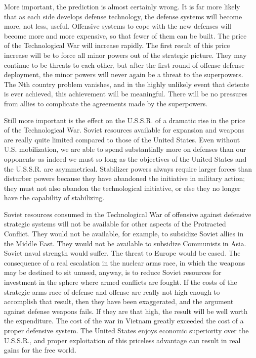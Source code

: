 More important, the prediction is almost certainly wrong. It is far more likely that as each side develops defense technology, the defense systems will become more, not less, useful. Offensive systems to cope with the new defenses will become more and more expensive, so that fewer of them can be built. The price of the Technological War will increase rapidly. The first result of this price increase will be to force all minor powers out of the strategic picture. They may continue to be threats to each other, but after the first round of offense-defense deployment, the minor powers will never again be a threat to the superpowers. The Nth country problem vanishes, and in the highly unlikely event that detente is ever achieved, this achievement will be meaningful. There will be no pressures from allies to complicate the agreements made by the superpowers.

Still more important is the effect on the U.S.S.R. of a dramatic rise in the price of the Technological War. Soviet resources available for expansion and weapons are really quite limited compared to those of the United States. Even without U.S. mobilization, we are able to spend substantially more on defenses than our opponents--as indeed we must so long as the objectives of the United States and the U.S.S.R. are asymmetrical. Stabilizer powers always require larger forces than disturber powers because they have abandoned the initiative in military action; they must not also abandon the technological initiative, or else they no longer have the capability of stabilizing.

Soviet resources consumed in the Technological War of offensive against defensive strategic systems will not be available for other aspects of the Protracted Conflict. They would not be available, for example, to subsidize Soviet allies in the Middle East. They would not be available to subsidize Communists in Asia. Soviet naval strength would suffer. The threat to Europe would be eased. The consequence of a real escalation in the nuclear arms race, in which the weapons may be destined to sit unused, anyway, is to reduce Soviet resources for investment in the sphere where armed conflicts are fought. If the costs of the strategic arms race of defense and offense are really not high enough to accomplish that result, then they have been exaggerated, and the argument against defense weapons fails. If they are that high, the result will be well worth the expenditure. The cost of the war in Vietnam greatly exceeded the cost of a proper defensive system. The United States enjoys economic superiority over the U.S.S.R., and proper exploitation of this priceless advantage can result in real gains for the free world.

